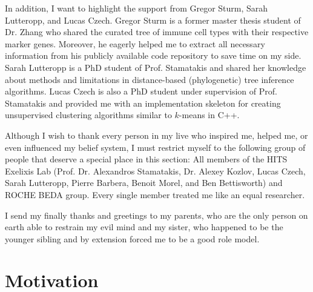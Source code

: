 \documentclass{thesisclass}
\begin{document}
\begin{addmargin}{0.5cm}
In addition, I want to highlight the support from Gregor Sturm, Sarah Lutteropp, and Lucas Czech. Gregor Sturm is a former master thesis student of Dr. Zhang who shared the curated tree of immune cell types with their respective marker genes. Moreover, he eagerly helped me to extract  all necessary information from his publicly available code repository to save time on my side. Sarah Lutteropp is a PhD student of Prof. Stamatakis and shared her knowledge about methods and limitations in distance-based (phylogenetic) tree inference algorithms. Lucas Czech is also a PhD student under supervision of Prof. Stamatakis and provided me with an implementation skeleton for creating unsupervised clustering algorithms similar to $k$-means in C++.

Although I wish to thank every person in my live who inspired me, helped me, or even influenced my belief system, I must restrict myself to the following group of people that deserve a special place in this section: All members of the HITS Exelixis Lab (Prof. Dr. Alexandros Stamatakis, Dr. Alexey Kozlov, Lucas Czech, Sarah Lutteropp, Pierre Barbera, Benoit Morel, and Ben Bettisworth) and ROCHE BEDA group. Every single member treated me like an equal researcher.

I send my finally thanks and greetings to my parents, who are the only person on earth able to restrain my evil mind and my sister, who happened to be the younger sibling and by extension forced me to be a good role model.

\end{addmargin}

\blankpage


\tableofcontents
\listoftodos
\blankpage


\mainmatter
{}

\chapter{Motivation}
\label{ch:motivation}

\end{document}
